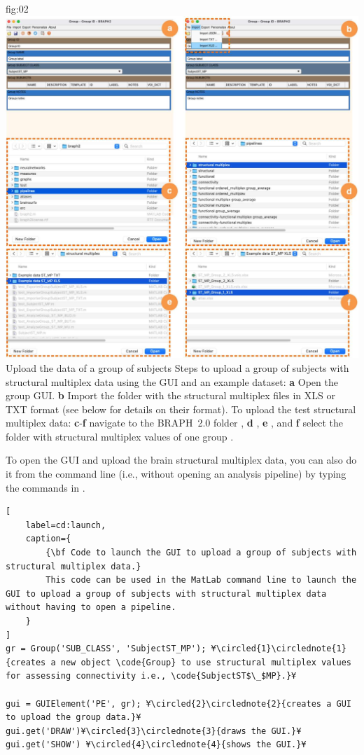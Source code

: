 \documentclass[justified]{tufte-handout}
\begin{document}
	{fig:02}
	{
	\includegraphics{fig02.jpg}
	}
	{Upload the data of a group of subjects}
	{
	Steps to upload a group of subjects with structural multiplex data using the GUI and an example dataset: 
	{\bf a} Open the group GUI.
	{\bf b} Import the folder with the structural multiplex files in XLS or TXT format (see below for details on their format).
	To upload the test structural multiplex data:
	{\bf c}-{\bf f} navigate to the BRAPH~2.0 folder , {\bf d} ,  {\bf e} , and {\bf f} select the folder with structural multiplex values of one group .
	}

To open the GUI and upload the brain structural multiplex data, you can also do it from the command line (i.e., without opening an analysis pipeline) by typing the commands in .
%
\begin{lstlisting}[
	label=cd:launch,
	caption={
		{\bf Code to launch the GUI to upload a group of subjects with structural multiplex data.}
		This code can be used in the MatLab command line to launch the GUI to upload a group of subjects with structural multiplex data without having to open a pipeline.
	}
]
gr = Group('SUB_CLASS', 'SubjectST_MP'); ¥\circled{1}\circlednote{1}{creates a new object \code{Group} to use structural multiplex values for assessing connectivity i.e., \code{SubjectST$\_$MP}.}¥

gui = GUIElement('PE', gr); ¥\circled{2}\circlednote{2}{creates a GUI to upload the group data.}¥
gui.get('DRAW')¥\circled{3}\circlednote{3}{draws the GUI.}¥
gui.get('SHOW') ¥\circled{4}\circlednote{4}{shows the GUI.}¥
\end{lstlisting}
\end{document}
